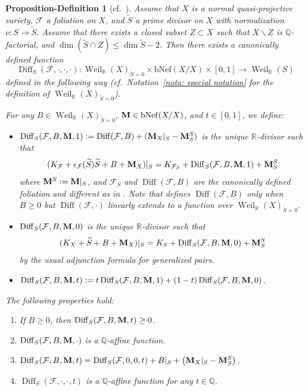 \documentclass[11pt,reqno]{amsart}
\numberwithin{equation}{section}
\newcommand{\Mm}{{\bf{M}}}
\newcommand{\Weil}{\operatorname{Weil}}
\newcommand{\Diff}{\operatorname{Diff}}
\newcommand{\Ff}{\mathcal{F}}
\newcommand{\bNef}{\mathrm{bNef}}
\newtheorem{prodef}[thm]{Proposition-Definition}
\theoremstyle{definition}
\begin{document}
\begin{prodef}[{cf.~\cite[Proposition-Definition~3.7]{CS25a}}]\label{prodef: CS25 3.7 r gpair}
Assume that $X$ is a normal quasi-projective variety, $\Ff$ a foliation on $X$, and $\widetilde{S}$ a prime divisor on $X$ with normalization $\nu: S\rightarrow\widetilde S$. Assume that there exists a closed subset $Z\subset X$ such that $X\backslash Z$ is $\mathbb Q$-factorial, and $\dim (\widetilde S\cap Z)\leq\dim\widetilde S-2$. Then there exists a canonically defined function $$\Diff_{S}(\Ff,\cdot,\cdot,\cdot): \Weil_{\mathbb R}(X)_{\widetilde{S}=0}\times\bNef(X/X)\times [0,1]\rightarrow\Weil_{\mathbb R}(S)$$
defined in the following way (cf.~Notation~\ref{nota: special notation} for the definition of $\Weil_{\mathbb R}(X)_{\widetilde{S}=0}$).


For any $B\in\Weil_{\mathbb R}(X)_{\widetilde{S}=0}$, $\Mm\in\bNef(X/X)$, and $t\in [0,1]$, we define:
\begin{itemize}
    \item $\Diff_S(\Ff,B,\Mm,1):=\Diff(\Ff,B)+(\Mm_X|_S-\Mm^S_S)$ is the unique $\mathbb R$-divisor such that
    $$(K_{\Ff}+\epsilon_{\Ff}(\widetilde S)\widetilde S+B+\Mm_X)|_S=K_{\Ff_S}+\Diff_S(\Ff,B,\Mm,1)+\Mm^S_S$$
    where $\Mm^S:=\Mm|_S$, and $\Ff_S$ and $\Diff(\Ff,B)$ are the canonically defined foliation and different as in \cite[Proposition-Definition~3.7]{CS25a}. Note that \cite[Proposition-Definition~3.7]{CS25a} defines $\Diff(\Ff,B)$ only when $B\geq 0$ but $\Diff(\Ff,\cdot)$ linearly extends to a function over $\Weil_{\mathbb R}(X)_{\widetilde{S}=0}$.
    \item $\Diff_S(\Ff,B,\Mm,0)$ is the unique $\mathbb R$-divisor such that
        $$(K_{X}+\widetilde S+B+\Mm_X)|_S=K_{S}+\Diff_S(\Ff,B,\Mm,0)+\Mm^S_S$$
        by the usual adjunction formula for generalized pairs.
        \item $\Diff_S(\Ff,B,\Mm,t):=t\Diff_S(\Ff,B,\Mm,1)+(1-t)\Diff_S(\Ff,B,\Mm,0)$.
\end{itemize}
The following properties hold:
\begin{enumerate}
    \item If $B\geq 0$, then $\Diff_S(\Ff,B,\Mm,t)\geq 0$.
    \item $\Diff_S(\Ff,B,\Mm,\cdot)$ is a $\mathbb Q$-affine function.
    \item $\Diff_S(\Ff,B,\Mm,t)=\Diff_S(\Ff,0,0,t)+B|_S+\left(\Mm_X|_S-\Mm^S_S\right)$.
    \item $\Diff_S(\Ff,\cdot,\cdot,t)$ is a $\mathbb Q$-affine function for any $t\in\mathbb Q$.

\end{enumerate}
\end{prodef}
\end{document}

